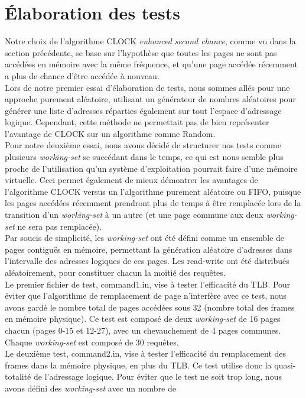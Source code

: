 \documentclass{article}
\begin{document}
\section{Élaboration des tests}
\setlength{\parindent}{20pt}
Notre choix de l’algorithme CLOCK \emph{enhanced second chance}, comme vu dans la section précédente, se base sur l’hypothèse que toutes les pages ne sont pas
 accédées en mémoire avec la même fréquence, et qu’une page accédée récemment a plus de chance d’être accédée à nouveau. 
\\
Lors de notre premier essai d’élaboration de tests, nous sommes allés pour une approche purement aléatoire, utilisant un générateur de nombres
 aléatoires pour générer une liste d’adresses réparties également sur tout l’espace d’adressage logique. Cependant, cette méthode ne permettait 
 pas de bien représenter l’avantage de CLOCK sur un algorithme comme Random. 
\\
Pour notre deuxième essai, nous avons décidé de structurer nos tests comme plusieurs \emph{working-set} se succédant dans le temps, ce qui est nous 
semble plus proche de l’utilisation qu’un système d’exploitation pourrait faire d’une mémoire virtuelle. Ceci permet également de mieux démontrer 
les avantages de l’algorithme CLOCK versus un l’algorithme purement aléatoire ou FIFO, puisque les pages accédées récemment prendront plus de 
temps à être remplacée lors de la transition d’un \emph{working-set} à un autre (et une page commune aux deux \emph{working-set} ne sera pas remplacée).
\\
Par soucis de simplicité, les \emph{working-set} ont été défini comme un ensemble de pages contiguës en mémoire, permettant la génération aléatoire 
d’adresses dans l’intervalle des adresses logiques de ces pages. Les read-write ont été distribués aléatoirement, pour constituer chacun la 
moitié des requêtes.    
\\
Le premier fichier de test, command1.in, vise à tester l’efficacité du TLB. Pour éviter que l’algorithme de remplacement de page n’interfère 
avec ce test, nous avons gardé le nombre total de pages accédées sous 32 (nombre total des frames en mémoire physique). Ce test est composé de 
deux \emph{working-set} de 16 pages chacun (pages 0-15 et 12-27), avec un chevauchement de 4 pages communes. Chaque \emph{working-set} est composé de 30 requêtes. 
\\
Le deuxième test, command2.in, vise à tester l’efficacité du remplacement des frames dans la mémoire physique, en plus du TLB. Ce test utilise 
donc la quasi-totalité de l’adressage logique. Pour éviter que le test ne soit trop long, nous avons défini des \emph{working-set} avec un nombre de 
\end{document}
